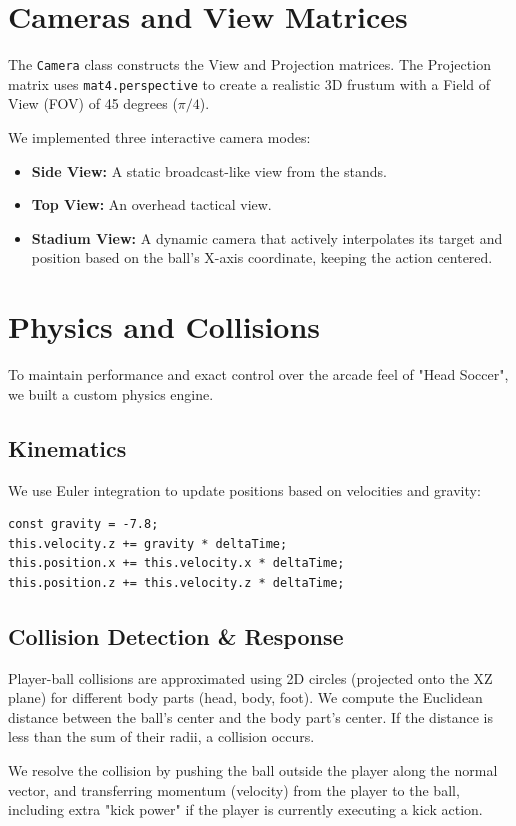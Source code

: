 \documentclass[10pt]{book}
\begin{document}
\section{Cameras and View Matrices}
The \texttt{Camera} class constructs the View and Projection matrices. The Projection matrix uses \texttt{mat4.perspective} to create a realistic 3D frustum with a Field of View (FOV) of 45 degrees ($\pi/4$).

We implemented three interactive camera modes:
\begin{itemize}
    \item \textbf{Side View:} A static broadcast-like view from the stands.
    \item \textbf{Top View:} An overhead tactical view.
    \item \textbf{Stadium View:} A dynamic camera that actively interpolates its target and position based on the ball's X-axis coordinate, keeping the action centered.
\end{itemize}

\section{Physics and Collisions}
To maintain performance and exact control over the arcade feel of "Head Soccer", we built a custom physics engine.

\subsection{Kinematics}
We use Euler integration to update positions based on velocities and gravity:
\begin{lstlisting}[style=vscode_C, caption=Procedural Walking Animation Math]
const gravity = -7.8;
this.velocity.z += gravity * deltaTime;
this.position.x += this.velocity.x * deltaTime;
this.position.z += this.velocity.z * deltaTime;
\end{lstlisting}

\subsection{Collision Detection \& Response}
Player-ball collisions are approximated using 2D circles (projected onto the XZ plane) for different body parts (head, body, foot). We compute the Euclidean distance between the ball's center and the body part's center. If the distance is less than the sum of their radii, a collision occurs.

We resolve the collision by pushing the ball outside the player along the normal vector, and transferring momentum (velocity) from the player to the ball, including extra "kick power" if the player is currently executing a kick action.
\end{document}
